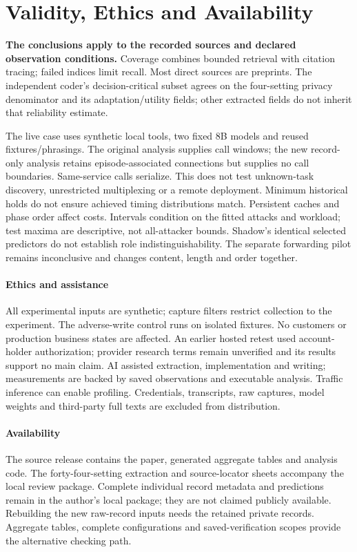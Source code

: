 \section{Validity, Ethics and Availability}\label{sec:validity}
\textbf{The conclusions apply to the recorded sources and declared observation conditions.}
Coverage combines bounded retrieval with citation tracing; failed indices limit recall. Most direct sources are preprints. The independent coder's decision-critical subset agrees on the four-setting privacy denominator and its adaptation/utility fields; other extracted fields do not inherit that reliability estimate.

The live case uses synthetic local tools, two fixed 8B models and reused fixtures/phrasings. The original analysis supplies call windows; the new record-only analysis retains episode-associated connections but supplies no call boundaries. Same-service calls serialize. This does not test unknown-task discovery, unrestricted multiplexing or a remote deployment. Minimum historical holds do not ensure achieved timing distributions match. Persistent caches and phase order affect costs. Intervals condition on the fitted attacks and workload; test maxima are descriptive, not all-attacker bounds. Shadow's identical selected predictors do not establish role indistinguishability. The separate forwarding pilot remains inconclusive and changes content, length and order together.

\paragraph{Ethics and assistance}
All experimental inputs are synthetic; capture filters restrict collection to the experiment. The adverse-write control runs on isolated fixtures. No customers or production business states are affected. An earlier hosted retest used account-holder authorization; provider research terms remain unverified and its results support no main claim. AI assisted extraction, implementation and writing; measurements are backed by saved observations and executable analysis. Traffic inference can enable profiling. Credentials, transcripts, raw captures, model weights and third-party full texts are excluded from distribution.

\paragraph{Availability}
The source release contains the paper, generated aggregate tables and analysis code. The forty-four-setting extraction and source-locator sheets accompany the local review package. Complete individual record metadata and predictions remain in the author's local package; they are not claimed publicly available. Rebuilding the new raw-record inputs needs the retained private records. Aggregate tables, complete configurations and saved-verification scopes provide the alternative checking path.

